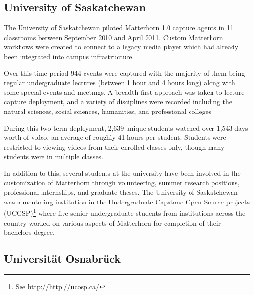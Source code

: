 \documentclass{sig-alternate}
\begin{document}
\subsection{University of Saskatchewan}
The University of Saskatchewan piloted Matterhorn 1.0 capture agents in 11 classrooms between September 2010 and April 2011.  Custom Matterhorn workflows were created to connect to a legacy media player which had already been integrated into campus infrastructure.

Over this time period 944 events were captured with the majority of them being regular undergraduate lectures (between 1 hour and 4 hours long) along with some special events and meetings.  A breadth first approach was taken to lecture capture deployment, and a variety of disciplines were recorded including the natural sciences, social sciences, humanities, and professional colleges.

During this two term deployment, 2,639 unique students watched over 1,543 days worth of video, an average of roughly 41 hours per student.  Students were restricted to viewing videos from their enrolled classes only, though many students were in multiple classes.

In addition to this, several students at the university have been involved in the customization of Matterhorn through volunteering, summer research positions, professional internships, and graduate theses.  The University of Saskatchewan was a mentoring institution in the Undergraduate Capstone Open Source projects (UCOSP)\footnote{See http://http://ucosp.ca/} where five senior undergraduate students from institutions across the country worked on various aspects of Matterhorn for completion of their bachelors degree.

\subsection{Universit\"{a}t Osnabr\"{u}ck}
\end{document}
